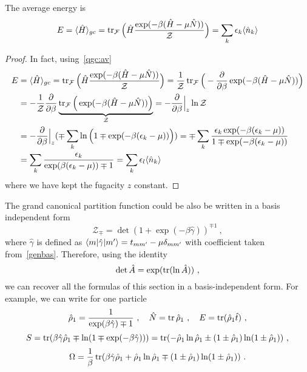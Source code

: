     The average energy is 
    \begin{equation*}\label{qg:e1}
        E = \langle\hat H\rangle_{gc} = \operatorname{tr}_{\mathcal F} \Big (\hat H \frac{\exp (-\beta (\hat H - \mu \hat N))}{\mathcal Z} \Big) = \sum_k \epsilon_k \langle\hat n_k\rangle
    \end{equation*}
    \begin{proof}
        In fact, using~\eqref{qgc:av}
        \begin{equation*}
        \begin{aligned}
            E & = \langle\hat H\rangle_{gc} = \operatorname{tr}_{\mathcal F} \Big (\hat H \frac{\exp (-\beta (\hat H - \mu \hat N))}{\mathcal Z} \Big) = \frac{1}{\mathcal Z} \operatorname{tr}_{\mathcal F} \Big (- \frac{\partial}{\partial\beta} \exp (-\beta (\hat H - \mu \hat N)) \Big) \\ &  = - \frac{1}{\mathcal Z} \frac{\partial}{\partial\beta}\underbrace{ \operatorname{tr}_{\mathcal F} \Big (\exp (-\beta (\hat H - \mu \hat N)) \Big)}_{\mathcal Z} = - \frac{\partial}{\partial\beta} \Big \vert_z \ln \mathcal Z \\ & =  - \frac{\partial}{\partial\beta} \Big \vert_z (\mp \sum_k \ln \Big (1 \mp \exp (-\beta (\epsilon_k - \mu)) \Big))  = \mp \sum_k \frac{\epsilon_k \exp (-\beta (\epsilon_k - \mu))}{1 \mp \exp (-\beta (\epsilon_k - \mu))}  \\ & = \sum_k \frac{\epsilon_k}{\exp (\beta (\epsilon_k - \mu)) \mp 1} = \sum_k \epsilon_l \langle\hat n_k\rangle
        \end{aligned}
        \end{equation*}
        where we have kept the fugacity $z$ constant.
    \end{proof}

    The grand canonical partition function could be also be written in a basis independent form
    \begin{equation*}
        \mathcal Z_{\mp} = \det (1 + \exp(-\beta \hat \gamma))^{\mp 1}  ~,
    \end{equation*}
    where $\hat \gamma$ is defined as $\langle m\vert \hat \gamma \vert m'\rangle = t_{mm'} - \mu \delta_{mm'}$ with coefficient taken from~\eqref{genbas}. Therefore, using the identity 
    \begin{equation*}
        \det \hat A = \exp (\operatorname{tr} (\ln \hat A))~,
    \end{equation*}
    we can recover all the formulas of this section in a basis-independent form. For example, we can write for one particle
    \begin{equation*}
        \hat \rho_1 = \frac{1}{\exp(\beta \hat \gamma) \mp 1} ~, \quad \hat N = \operatorname{tr} \hat \rho_1 ~, \quad E = \operatorname{tr} (\hat \rho_1 \hat t) ~, 
    \end{equation*}
    \begin{equation*}
        S = \operatorname{tr} (\beta \hat \gamma \hat \rho_1 \mp \ln (1 \mp \exp(-\beta \hat \gamma))) = \operatorname{tr} (- \hat \rho_1 \ln \hat \rho_1 \pm (1 \pm \hat \rho_1) \ln (1 \pm \hat \rho_1)) ~,
    \end{equation*}
    \begin{equation*}
        \Omega = \frac{1}{\beta} \operatorname{tr}(\beta \hat \gamma \hat \rho_1 + \hat \rho_1 \ln \hat \rho_1 \mp (1 \pm \hat \rho_1) \ln (1 \pm \hat \rho_1)) ~.
    \end{equation*}

